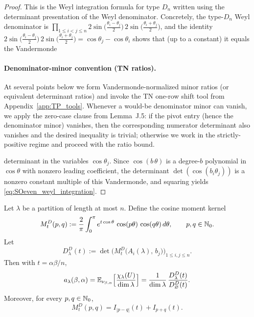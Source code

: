 \begin{proof}
This is the Weyl integration formula for type $D_n$ written using the determinant presentation of the Weyl denominator.
Concretely, the type-$D_n$ Weyl denominator is
\(
\prod_{1\le i<j\le n}2\sin\big(\frac{\theta_i-\theta_j}{2}\big)\,2\sin\big(\frac{\theta_i+\theta_j}{2}\big)
\),
and the identity
\(
2\sin\big(\frac{\theta_i-\theta_j}{2}\big)\,2\sin\big(\frac{\theta_i+\theta_j}{2}\big)
= \cos\theta_j-\cos\theta_i
\)
shows that (up to a constant) it equals the Vandermonde

\paragraph{Denominator-minor convention (TN ratios).}
At several points below we form Vandermonde-normalized minor ratios (or equivalent determinant ratios) and invoke the TN one-row shift tool from Appendix~\ref{app:TP_tools}.
Whenever a would-be denominator minor can vanish, we apply the zero-case clause from Lemma~J.5:
if the pivot entry (hence the denominator minor) vanishes, then the corresponding numerator determinant also vanishes and the desired inequality is trivial; otherwise we work in the strictly-positive regime and proceed with the ratio bound.


 determinant in the variables $\cos\theta_j$.
Since $\cos(b\,\theta)$ is a degree-$b$ polynomial in $\cos\theta$ with nonzero leading coefficient, the determinant
$\det(\cos(b_i\theta_j))$ is a nonzero constant multiple of this Vandermonde, and squaring yields \eqref{eq:SOeven_weyl_integration}.
\end{proof}

\begin{proposition}
\label{prop:SOeven_det_formula}
Let $\lambda$ be a partition of length at most $n$.
Define the cosine moment kernel
\begin{equation}
\label{eq:SOeven_kernel_def}
M_t^{D}(p,q)
:=\frac{2}{\pi}\int_0^{\pi} e^{t\cos\theta}\,\cos(p\theta)\,\cos(q\theta)\,d\theta,
\qquad p,q\in\mathbb N_0.
\end{equation}
Let
\begin{equation}
\label{eq:SOeven_Dlambda_def}
D_{\lambda}^{D}(t)
:=\det\Big(M_t^{D}\big(A_i(\lambda),\,b_j\big)\Big)_{1\le i,j\le n}.
\end{equation}
Then with $t=\alpha\beta/n$,
\begin{equation}
\label{eq:SOeven_coeff_det_ratio}
 a_{\lambda}(\beta,\alpha)
=\mathbb E_{\nu_{\beta,\alpha}}\Big[\frac{\chi_{\lambda}(U)}{\dim\lambda}\Big]
=\frac{1}{\dim\lambda}\,\frac{D_{\lambda}^{D}(t)}{D_{\varnothing}^{D}(t)}.
\end{equation}
Moreover, for every $p,q\in\mathbb N_0$,
\begin{equation}
\label{eq:SOeven_kernel_bessel}
M_t^{D}(p,q)=I_{|p-q|}(t)+I_{p+q}(t).
\end{equation}
\end{proposition}


